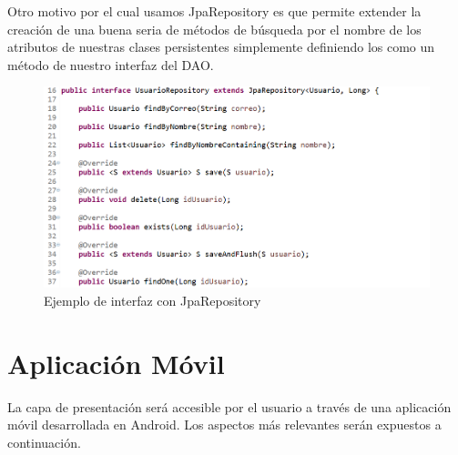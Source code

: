 Otro motivo por el cual usamos JpaRepository es que permite extender la creación de una buena seria de métodos de búsqueda por el nombre de los atributos de nuestras clases persistentes simplemente definiendo los como un método de nuestro interfaz del DAO.
	\begin{figure}[H]
		\centering
		\includegraphics[width=\textwidth] {jparepository.PNG}
		\caption{Ejemplo de interfaz con JpaRepository }
		\label{fig:jparepository}
	\end{figure}
\section{Aplicación Móvil}
La capa de presentación será accesible por el usuario a través de una aplicación móvil desarrollada en Android. Los aspectos más relevantes serán expuestos a continuación.

